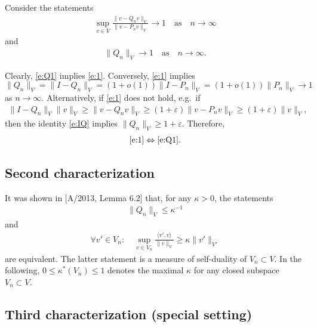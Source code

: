 \documentclass[12pt]{article}
\newcommand{\norm}[2]{\|#1\|_{#2}}
\newcommand{\scalar}[2]{\langle#1\rangle_{#2}}
\begin{document}
	
	Consider the statements
	\begin{align}
		\label{e:1}
		\sup_{v \in V}
		\frac{
			\norm{v - Q_n v}{V}
		}{
			\norm{v - P_n v}{V}
		}
		\to 1
		\quad\text{as}\quad
		n \to \infty
	\end{align}
	and
	\begin{align}
		\label{e:Q1}
		\norm{Q_n}{V} \to 1
		\quad\text{as}\quad
		n \to \infty
		.
	\end{align}
	
	
	Clearly, \eqref{e:Q1} implies \eqref{e:1}.
	Conversely, 
	\eqref{e:1} implies
	$
		\norm{Q_n}{V} = \norm{I - Q_n}{V}
		=
		(1 + o(1))
		\norm{I - P_n}{V}
		=
		(1 + o(1))
		\norm{P_n}{V}
		\to 1
	$
	as $n \to \infty$.
	Alternatively,
	if \eqref{e:1} does not hold,
	e.g.~if
	\begin{align}
		\norm{I - Q_n}{V} \norm{v}{V}
		\geq 
		\norm{v - Q_n v}{V} 
		\geq 
		(1 + \varepsilon) \norm{v - P_n v}{V}
		\geq 
		(1 + \varepsilon) \norm{v}{V}
		,
	\end{align}
	then
	the identity \eqref{e:IQ} implies
	$\norm{Q_n}{V} \geq 1 + \varepsilon$.
	Therefore, 
	\begin{align}
		\eqref{e:1}
		\Leftrightarrow
		\eqref{e:Q1}
		.
	\end{align}
	
	
	\subsection*{Second characterization}
	
	
	It was shown in [A/2013, Lemma 6.2] that,
	for any $\kappa > 0$,
	the statements
	\begin{align}
		\label{e:A-Qk}
		\norm{Q_n}{V} \leq \kappa^{-1}
	\end{align}
	and
	\begin{align}
		\label{e:A-Vk}
		\forall v' \in V_n:
		\quad
		\sup_{v \in V_n}
		\frac{
			\scalar{v', v}{}
		}{
			\norm{v}{V}
		}
		\geq
		\kappa
		\norm{v'}{V'} 
	\end{align}
	are equivalent.
	The latter statement is a measure of self-duality of $V_n \subset V$.
	In the following, $0 \leq \kappa^*(V_n) \leq 1$ denotes 
	the maximal $\kappa$
	for any closed subspace $V_n \subset V$.
	
	
	\subsection*{Third characterization (special setting)}
	
\end{document}
